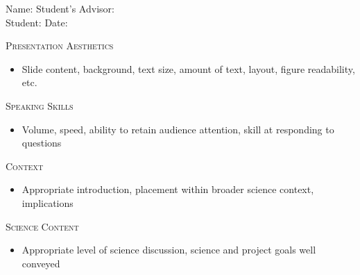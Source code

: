 \documentclass[12pt,onecolumn]{article}
\newcommand*{\showline}[1][2]{\makebox[#1in]{\hrulefill}}
\begin{document}
{\large
Name: \showline \hspace{20pt}
Student's Advisor: \showline\\
Student: \showline[2.5] \hspace{20pt}
Date: \showline[1.5]\\ \vspace{16pt} }

{\large
\textsc{Presentation Aesthetics}}
\begin{itemize}
\item Slide content, background, text size, amount of text, layout, figure readability, etc.
\end{itemize}
\vspace{100pt}

{\large\textsc{Speaking Skills}}
\begin{itemize}
\item Volume, speed, ability to retain audience attention, skill at responding  to questions
\end{itemize}
\vspace{100pt}

{\large\textsc{Context}}
\begin{itemize}
\item Appropriate introduction, placement within broader science context, implications
\end{itemize}
\vspace{100pt}

{\large\textsc{Science Content}}
\begin{itemize}
\item Appropriate level of science discussion, science and project goals well conveyed
\end{itemize}
\end{document}
